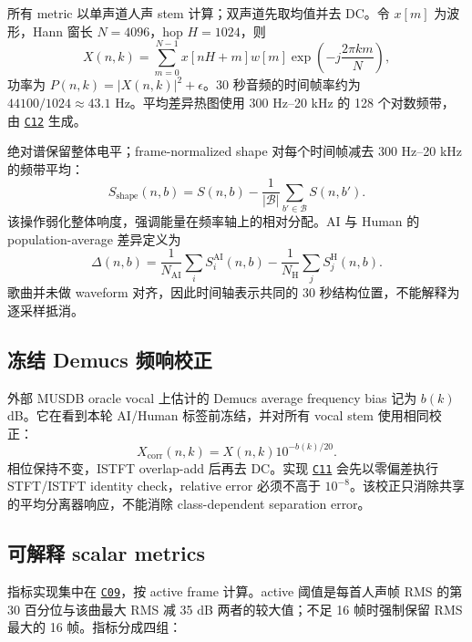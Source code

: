 \documentclass[UTF8,11pt,a4paper,fontset=none]{ctexart}
\newcommand{\coderef}[1]{\hyperlink{code:#1}{\texttt{#1}}}
\begin{document}
所有 metric 以单声道人声 stem 计算；双声道先取均值并去 DC。令 $x[m]$ 为波形，Hann 窗长 $N=4096$，hop $H=1024$，则
\begin{equation}
X(n,k)=\sum_{m=0}^{N-1}x[nH+m]w[m]\exp\!\left(-j\frac{2\pi km}{N}\right),
\label{eq:stft}
\end{equation}
功率为 $P(n,k)=|X(n,k)|^2+\epsilon$。30 秒音频的时间帧率约为 $44100/1024\approx43.1$ Hz。平均差异热图使用 300 Hz--20 kHz 的 128 个对数频带，由 \coderef{C12} 生成。

绝对谱保留整体电平；frame-normalized shape 对每个时间帧减去 300 Hz--20 kHz 的频带平均：
\begin{equation}
S_{\mathrm{shape}}(n,b)=S(n,b)-\frac{1}{|\mathcal{B}|}\sum_{b'\in\mathcal{B}}S(n,b').
\label{eq:shape}
\end{equation}
该操作弱化整体响度，强调能量在频率轴上的相对分配。AI 与 Human 的 population-average 差异定义为
\begin{equation}
\Delta(n,b)=\frac{1}{N_{\mathrm{AI}}}\sum_i S_i^{\mathrm{AI}}(n,b)
-\frac{1}{N_{\mathrm{H}}}\sum_j S_j^{\mathrm{H}}(n,b).
\label{eq:average-diff}
\end{equation}
歌曲并未做 waveform 对齐，因此时间轴表示共同的 30 秒结构位置，不能解释为逐采样抵消。

\subsection{冻结 Demucs 频响校正}

外部 MUSDB oracle vocal 上估计的 Demucs average frequency bias 记为 $b(k)$ dB。它在看到本轮 AI/Human 标签前冻结，并对所有 vocal stem 使用相同校正：
\begin{equation}
X_{\mathrm{corr}}(n,k)=X(n,k)10^{-b(k)/20}.
\label{eq:bias-correction}
\end{equation}
相位保持不变，ISTFT overlap-add 后再去 DC。实现 \coderef{C11} 会先以零偏差执行 STFT/ISTFT identity check，relative error 必须不高于 $10^{-8}$。该校正只消除共享的平均分离器响应，不能消除 class-dependent separation error。

\subsection{可解释 scalar metrics}

指标实现集中在 \coderef{C09}，按 active frame 计算。active 阈值是每首人声帧 RMS 的第 30 百分位与该曲最大 RMS 减 35 dB 两者的较大值；不足 16 帧时强制保留 RMS 最大的 16 帧。指标分成四组：
\end{document}

